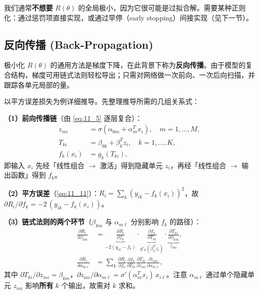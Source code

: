 \begin{remark}[正则化的必要性]
我们通常\textbf{不想要} $R(\theta)$ 的全局极小，因为它很可能是过拟合解。需要某种正则化：通过惩罚项直接实现，或通过早停（early stopping）间接实现（见下一节）。
\end{remark}

\subsection{反向传播 (Back-Propagation)}

极小化 $R(\theta)$ 的通用方法是梯度下降，在此背景下称为\textbf{反向传播}。由于模型的复合结构，梯度可用链式法则轻松导出；只需对网络做一次前向、一次后向扫描，并跟踪各单元局部的量。

以平方误差损失为例详细推导。先整理推导所需的几组关系式：

\begin{remark}[推导所需的关系式]
\textbf{（1）前向传播链}（由 \ref{eq:11_5} 逐层复合）：
\begin{align}
z_{mi} &= \sigma(\alpha_{0m} + \alpha_m^T x_i), \quad m=1,\dots,M, \nonumber \\
T_{ki} &= \beta_{0k} + \beta_k^T z_i, \quad k=1,\dots,K, \nonumber \\
f_k(x_i) &= g_k(T_{ki}), \label{eq:11_11a}
\end{align}
即输入 $x_i$ 先经「线性组合 $\to$ 激活」得到隐藏单元 $z_i$，再经「线性组合 $\to$ 输出函数」得到 $f_k$。

\textbf{（2）平方误差}（\ref{eq:11_11}）：$R_i = \sum_k (y_{ik} - f_k(x_i))^2$，故 $\partial R_i/\partial f_k = -2\,(y_{ik} - f_k(x_i))$。

\textbf{（3）链式法则的两个环节}（$\beta_{km}$ 与 $\alpha_{m\ell}$ 分别影响 $f_k$ 的路径）：
\begin{align}
\frac{\partial R_i}{\partial \beta_{km}} &=
\underbrace{\frac{\partial R_i}{\partial f_k}}_{-2(y_{ik}-f_k)}
\cdot \underbrace{\frac{\partial f_k}{\partial T_{ki}}}_{g'_k(\beta_k^T z_i)}
\cdot \underbrace{\frac{\partial T_{ki}}{\partial \beta_{km}}}_{z_{mi}}, \label{eq:11_11b} \\
\frac{\partial R_i}{\partial \alpha_{m\ell}} &=
\sum_{k} \frac{\partial R_i}{\partial f_k} \frac{\partial f_k}{\partial T_{ki}} \frac{\partial T_{ki}}{\partial z_{mi}} \frac{\partial z_{mi}}{\partial \alpha_{m\ell}}, \label{eq:11_11c}
\end{align}
其中 $\partial T_{ki}/\partial z_{mi} = \beta_{km}$，$\partial z_{mi}/\partial \alpha_{m\ell} = \sigma'(\alpha_m^T x_i)\, x_{i\ell}$。注意 $\alpha_{m\ell}$ 通过单个隐藏单元 $z_{mi}$ 影响\textbf{所有} $k$ 个输出，故需对 $k$ 求和。
\end{remark}

